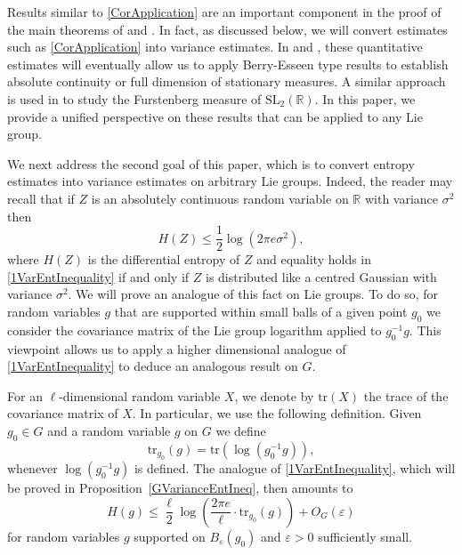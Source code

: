 \documentclass[10pt, english,oneside,reqno]{amsart}
\theoremstyle{plain}
\theoremstyle{remark}
\numberwithin{equation}{section}
\numberwithin{figure}{section}
\newcommand{\eps}{\varepsilon}
\newcommand{\tr}{\mathrm{tr}}
\newcommand{\R}{\mathbb{R}}
\begin{document}
Results similar to \eqref{CorApplication} are an important component in the proof of the main theorems of \cite{KittleKogler2024ACSS} and \cite{KittleKogler2024Dimension}. In fact, as discussed below, we will convert estimates such as \eqref{CorApplication} into variance estimates. In \cite{KittleKogler2024ACSS} and \cite{KittleKogler2024Dimension}, these quantitative estimates will eventually allow us to apply Berry-Esseen type results to establish absolute continuity or full dimension of stationary measures. A similar approach is used in \cite{Kittle2023} to study the Furstenberg measure of $\mathrm{SL}_2(\R)$. In this paper, we provide a unified perspective on these results that can be applied to any Lie group.

We next address the second goal of this paper, which is to convert entropy estimates into variance estimates on arbitrary Lie groups. Indeed, the reader may recall that if $Z$ is an absolutely continuous random variable on $\R$ with variance $\sigma^2$ then 
\begin{equation}\label{1VarEntInequality}
    H(Z) \leq \frac{1}{2} \log(2\pi e \sigma^2),
\end{equation} where $H(Z)$ is the differential entropy of $Z$
and equality holds in \eqref{1VarEntInequality} if and only if $Z$ is distributed like a centred Gaussian with variance $\sigma^2$. We will prove an analogue of this fact on Lie groups. To do so, for random variables $g$ that are supported within small balls of a given point $g_0$ we consider the covariance matrix of the Lie group logarithm applied to $g_0^{-1}g$. This viewpoint allows us to apply a higher dimensional analogue of \eqref{1VarEntInequality} to deduce an analogous result on $G$. 

For an $\ell$-dimensional random variable $X$, we denote by $\mathrm{tr}(X)$ the trace of the covariance matrix of $X$.  In particular, we use the following definition. Given $g_0 \in G$ and a random variable $g$ on $G$ we define $$\mathrm{tr}_{g_0}(g) = \mathrm{tr}(\log(g_0^{-1}g)),$$ whenever $\log(g_0^{-1}g)$ is defined. The analogue of \eqref{1VarEntInequality}, which will be proved in Proposition~\ref{GVarianceEntIneq}, then amounts to 
\begin{equation}\label{IntroGVarIneq}
    H(g) \leq \frac{\ell}{2}\log\left( \frac{2 \pi e}{\ell} \cdot \tr_{g_0}(g) \right) + O_G(\eps)
\end{equation}
for random variables $g$ supported on $B_{\eps}(g_0)$ and $\eps > 0$ sufficiently small. 
\end{document}
